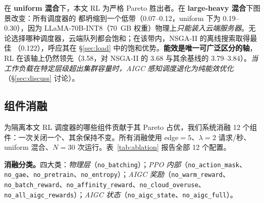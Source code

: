在 \textbf{uniform 混合}下，本文 RL 为严格 Pareto 胜出者。在 \textbf{large-heavy 混合}下图景改变：所有调度器的 \slo{} 都坍缩到一个低带（0.07--0.12，uniform 下为 0.19--0.30），因为 LLaMA-70B-INT8（70~GB 权重）物理上\emph{只能装入云端服务器}。无论选择哪种调度器，云端队列都会饱和；在该带内，NSGA-II 的离线搜索取得最佳 \slo{}（0.122），呼应其在 \S\ref{sec:load} 中的饱和优势。\textbf{能效是唯一可广泛区分的轴}，RL 在该轴上仍然领先（3.58，对 NSGA-II 的 3.68 与其余基线的 3.79--3.84）。\emph{当工作负载在特定层级超出集群容量时，AIGC 感知调度退化为纯能效优化}（\S\ref{sec:discuss} 讨论）。

\subsection{组件消融}
\label{sec:ablation}

为隔离本文 RL 调度器的哪些组件贡献于其 Pareto 占优，我们系统消融 12 个组件：一次关闭一个、其余保持不变。所有消融使用 edge${=}5$、$\lambda{=}2$ 请求/秒、uniform 混合、$N{=}30$ 次运行。表~\ref{tab:ablation} 报告全部 12 个配置。

\textbf{消融分类。}四大类：\emph{物理层}（\texttt{no\_batching}）；\emph{PPO 内部}（\texttt{no\_action\_mask}、\texttt{no\_gae}、\texttt{no\_pretrain}、\texttt{no\_entropy}）；\emph{AIGC 奖励}（\texttt{no\_warm\_reward}、\texttt{no\_batch\_reward}、\texttt{no\_affinity\_reward}、\texttt{no\_cloud\_overuse}、\texttt{no\_all\_aigc\_rewards}）；\emph{AIGC 状态}（\texttt{no\_aigc\_state}、\texttt{no\_aigc\_full}）。

